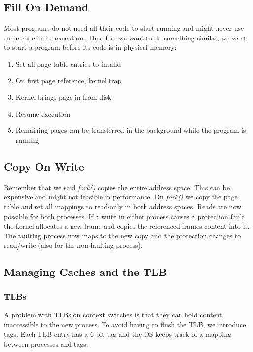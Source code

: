 \subsection{Fill On Demand}

Most programs do not need all their code to start running and might never use some code in its execution. Therefore we want to do something similar, we want to start a program before its code is in physical memory:
\begin{enumerate}
	\item Set all page table entries to invalid
	\item On first page reference, kernel trap
	\item Kernel brings page in from disk
	\item Resume execution
	\item Remaining pages can be transferred in the background while the program is running
\end{enumerate}


\subsection{Copy On Write}

Remember that we said \textit{fork()} copies the entire address space. This can be expensive and might not feasible in performance. On \textit{fork()} we copy the page table and set all mappings to read-only in both address spaces. Reads are now possible for both processes. If a write in either process causes a protection fault the kernel allocates a new frame and copies the referenced frames content into it. The faulting process now maps to the new copy and the protection changes to read/write (also for the non-faulting process).


\subsection{Managing Caches and the TLB}

\subsubsection{TLBs}

A problem with TLBs on context switches is that they can hold content inaccessible to the new process. To avoid having to flush the TLB, we introduce tags. Each TLB entry has a $6$-bit tag and the OS keeps track of a mapping between processes and tags. \medskip

